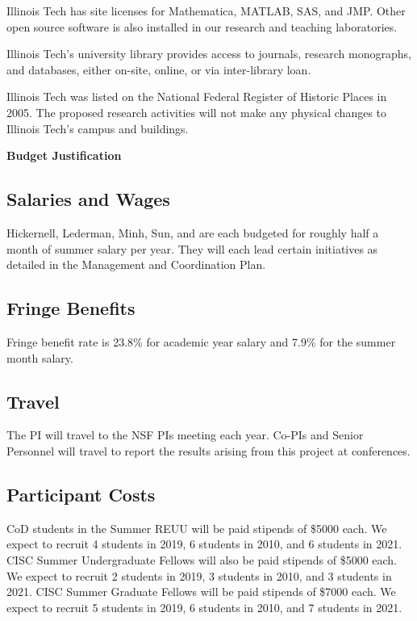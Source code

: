 \documentclass[11pt]{NSFamsart}
\begin{document}
Illinois Tech has site licenses for Mathematica, MATLAB, SAS, and JMP.  Other open source software is also installed in our research and teaching laboratories.

Illinois Tech's university library provides access to journals, research monographs, and databases, either on-site, online, or via inter-library loan.

Illinois Tech was listed on the National Federal Register of Historic Places in 2005. The proposed research activities will not make any physical changes to Illinois Tech's campus and buildings.


\newpage \setcounter{page}{1} %

\centerline{\textbf{\Large Budget Justification}}
\hypertarget{BudgetJust}{}

\subsection*{Salaries and Wages}

Hickernell, Lederman, Minh, Sun, and \JW are each budgeted for roughly half a month of summer salary per year.  They will each lead certain initiatives as detailed in the Management and Coordination Plan.

\subsection*{Fringe Benefits}
Fringe benefit rate is 23.8\% for academic year salary and 7.9\% for the summer month
salary.

\subsection*{Travel}
The PI will travel to the NSF PIs meeting each year.  Co-PIs and Senior Personnel will travel to report the results arising from this project at conferences.

\subsection*{Participant Costs}
CoD students in the Summer REUU will be paid stipends of \$5000 each.  We expect to recruit 4 students in 2019, 6 students in 2010, and 6 students in 2021.  CISC Summer Undergraduate Fellows will also be paid stipends of \$5000 each. We expect to recruit 2 students in 2019, 3 students in 2010, and 3 students in 2021.  CISC Summer Graduate Fellows will be paid stipends of \$7000 each. We expect to recruit 5 students in 2019, 6 students in 2010, and 7 students in 2021. 
\end{document}
